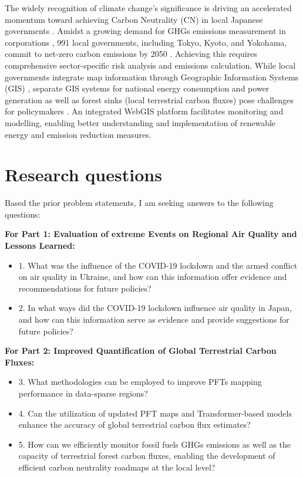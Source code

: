 The widely recognition of climate change's significance \citep{primack2009impact, watanabe2009general, ogawa2013ecological, shibuya2016effect} is driving an accelerated momentum toward achieving Carbon Neutrality (CN) in local Japanese governments \citep{nakazawa2023net}. Amidst a growing demand for GHGs emissions measurement in corporations \citep{kauffmann2012corporate}, 991 local governments, including Tokyo, Kyoto, and Yokohama, commit to net-zero carbon emissions by 2050 \citep{zerocarboncities}. Achieving this requires comprehensive sector-specific risk analysis and emissions calculation. While local governments integrate map information through Geographic Information Systems (GIS) \citep{nikkei}, separate GIS systems for national energy consumption and power generation as well as forest sinks (local terrestrial carbon fluxes) pose challenges for policymakers \citep{Toshihiko, kitamoto, nlftp}. An integrated WebGIS platform facilitates monitoring and modelling, enabling better understanding and implementation of renewable energy and emission reduction measures. \par
\section{Research questions}
Based the prior problem statements, I am seeking answers to the following questions:

\textbf{For Part 1: Evaluation of extreme Events on Regional Air Quality and Lessons Learned:}
\begin{itemize}
    \item 1. What was the influence of the COVID-19 lockdown and the armed conflict on air quality in Ukraine, and how can this information offer evidence and recommendations for future policies?
    \item 2. In what ways did the COVID-19 lockdown influence air quality in Japan, and how can this information serve as evidence and provide suggestions for future policies?
\end{itemize}

\textbf{For Part 2: Improved Quantification of Global Terrestrial Carbon Fluxes:}
\begin{itemize}
    \item 3. What methodologies can be employed to improve PFTs mapping performance in data-sparse regions?
    \item 4. Can the utilization of updated PFT maps and Transformer-based models enhance the accuracy of global terrestrial carbon flux estimates?
    \item 5. How can we efficiently monitor fossil fuels GHGs emissions as well as the capacity of terrestrial forest carbon fluxes, enabling the development of efficient carbon neutrality roadmaps at the local level?
\end{itemize}

